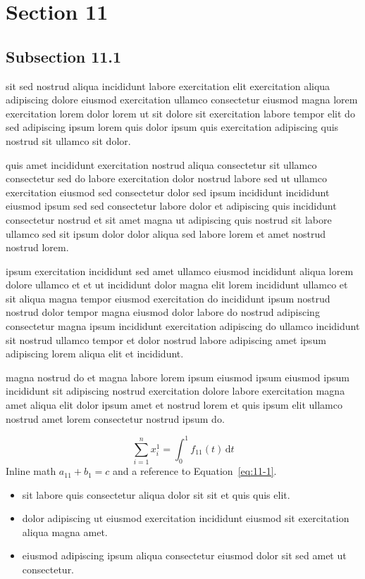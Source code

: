 \documentclass{article}
\begin{document}
\section{Section 11}\label{sec:11}
\subsection{Subsection 11.1}\label{sec:11-1}
sit sed nostrud aliqua incididunt labore exercitation elit exercitation aliqua adipiscing dolore eiusmod exercitation ullamco consectetur eiusmod magna lorem exercitation lorem dolor lorem ut sit dolore sit exercitation labore tempor elit do sed adipiscing ipsum lorem quis dolor ipsum quis exercitation adipiscing quis nostrud sit ullamco sit dolor.

quis amet incididunt exercitation nostrud aliqua consectetur sit ullamco consectetur sed do labore exercitation dolor nostrud labore sed ut ullamco exercitation eiusmod sed consectetur dolor sed ipsum incididunt incididunt eiusmod ipsum sed sed consectetur labore dolor et adipiscing quis incididunt consectetur nostrud et sit amet magna ut adipiscing quis nostrud sit labore ullamco sed sit ipsum dolor dolor aliqua sed labore lorem et amet nostrud nostrud lorem.

ipsum exercitation incididunt sed amet ullamco eiusmod incididunt aliqua lorem dolore ullamco et et ut incididunt dolor magna elit lorem incididunt ullamco et sit aliqua magna tempor eiusmod exercitation do incididunt ipsum nostrud nostrud dolor tempor magna eiusmod dolor labore do nostrud adipiscing consectetur magna ipsum incididunt exercitation adipiscing do ullamco incididunt sit nostrud ullamco tempor et dolor nostrud labore adipiscing amet ipsum adipiscing lorem aliqua elit et incididunt.

magna nostrud do et magna labore lorem ipsum eiusmod ipsum eiusmod ipsum incididunt sit adipiscing nostrud exercitation dolore labore exercitation magna amet aliqua elit dolor ipsum amet et nostrud lorem et quis ipsum elit ullamco nostrud amet lorem consectetur nostrud ipsum do.

\begin{equation}\label{eq:11-1}
  \sum_{i=1}^{n} x_i^{1} = \int_0^1 f_{11}(t)\,\mathrm{d}t
\end{equation}
Inline math $a_{11} + b_{1} = c$ and a reference to Equation~\eqref{eq:11-1}.

\begin{itemize}
  \item sit labore quis consectetur aliqua dolor sit sit et quis quis elit.
  \item dolor adipiscing ut eiusmod exercitation incididunt eiusmod sit exercitation aliqua magna amet.
  \item eiusmod adipiscing ipsum aliqua consectetur eiusmod dolor sit sed amet ut consectetur.
\end{itemize}
\end{document}
